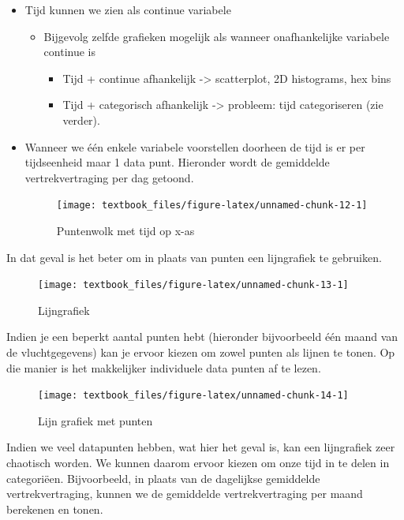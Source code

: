 \documentclass[]{tufte-book}
\providecommand{\tightlist}{%
  \setlength{\itemsep}{0pt}\setlength{\parskip}{0pt}}
\begin{document}
\begin{itemize}
\tightlist
\item
  Tijd kunnen we zien als continue variabele

  \begin{itemize}
  \tightlist
  \item
    Bijgevolg zelfde grafieken mogelijk als wanneer onafhankelijke variabele continue is

    \begin{itemize}
    \tightlist
    \item
      Tijd + continue afhankelijk -\textgreater{} scatterplot, 2D histograms, hex bins
    \item
      Tijd + categorisch afhankelijk -\textgreater{} probleem: tijd categoriseren (zie verder).
    \end{itemize}
  \end{itemize}
\item
  Wanneer we één enkele variabele voorstellen doorheen de tijd is er per tijdseenheid maar 1 data punt. Hieronder wordt de gemiddelde vertrekvertraging per dag getoond.\\

  \begin{figure}
  \texttt{[image: textbook\_files/figure-latex/unnamed-chunk-12-1]} \caption[Puntenwolk met tijd op x-as]{Puntenwolk met tijd op x-as}\label{fig:unnamed-chunk-12}
  \end{figure}
\end{itemize}

In dat geval is het beter om in plaats van punten een lijngrafiek te gebruiken.

\begin{figure}
\texttt{[image: textbook\_files/figure-latex/unnamed-chunk-13-1]} \caption[Lijngrafiek]{Lijngrafiek}\label{fig:unnamed-chunk-13}
\end{figure}

Indien je een beperkt aantal punten hebt (hieronder bijvoorbeeld één maand van de vluchtgegevens) kan je ervoor kiezen om zowel punten als lijnen te tonen. Op die manier is het makkelijker individuele data punten af te lezen.

\begin{figure}
\texttt{[image: textbook\_files/figure-latex/unnamed-chunk-14-1]} \caption[Lijn grafiek met punten]{Lijn grafiek met punten}\label{fig:unnamed-chunk-14}
\end{figure}

Indien we veel datapunten hebben, wat hier het geval is, kan een lijngrafiek zeer chaotisch worden. We kunnen daarom ervoor kiezen om onze tijd in te delen in categoriëen. Bijvoorbeeld, in plaats van de dagelijkse gemiddelde vertrekvertraging, kunnen we de gemiddelde vertrekvertraging per maand berekenen en tonen.
\end{document}
